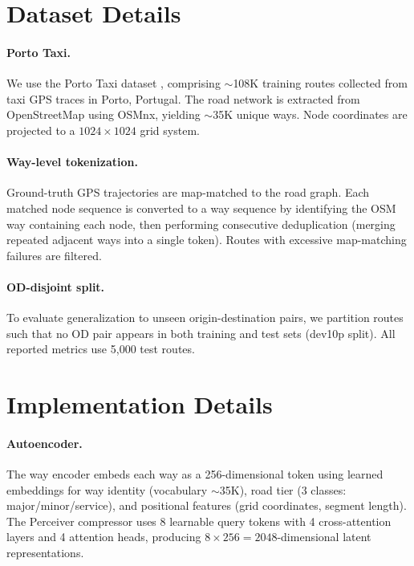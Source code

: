 
\section{Dataset Details}
\label{app:data}

\paragraph{Porto Taxi.}
We use the Porto Taxi dataset \citep{porto_taxi_dataset}, comprising $\sim$108K training routes collected from taxi GPS traces in Porto, Portugal.
The road network is extracted from OpenStreetMap using OSMnx, yielding $\sim$35K unique ways.
Node coordinates are projected to a $1024 \times 1024$ grid system.

\paragraph{Way-level tokenization.}
Ground-truth GPS trajectories are map-matched to the road graph.
Each matched node sequence is converted to a way sequence by identifying the OSM way containing each node, then performing consecutive deduplication (merging repeated adjacent ways into a single token).
Routes with excessive map-matching failures are filtered.

\paragraph{OD-disjoint split.}
To evaluate generalization to unseen origin-destination pairs, we partition routes such that no OD pair appears in both training and test sets (dev10p split).
All reported metrics use 5{,}000 test routes.

\section{Implementation Details}
\label{app:impl}

\paragraph{Autoencoder.}
The way encoder embeds each way as a 256-dimensional token using learned embeddings for way identity (vocabulary $\sim$35K), road tier (3 classes: major/minor/service), and positional features (grid coordinates, segment length).
The Perceiver compressor uses 8 learnable query tokens with 4 cross-attention layers and 4 attention heads, producing $8 \times 256 = 2048$-dimensional latent representations.


